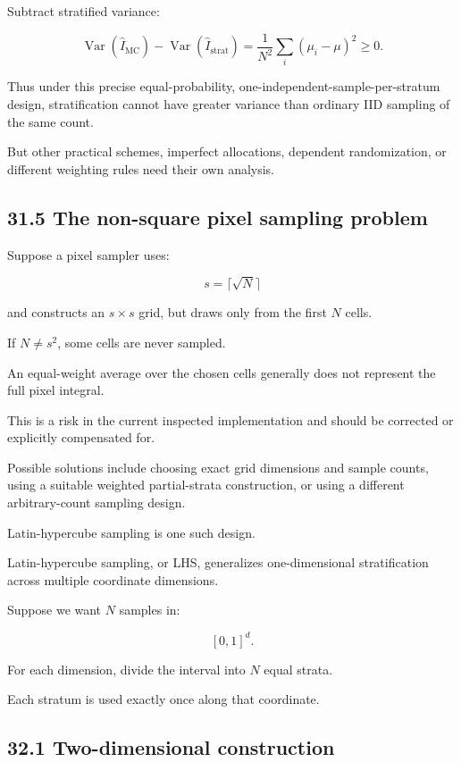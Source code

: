 Subtract stratified variance:

\[ \boxed{ \operatorname{Var}(\widehat I_{\mathrm{MC}}) - \operatorname{Var}(\widehat I_{\mathrm{strat}}) = \frac1{N^2}\sum_i(\mu_i-\mu)^2 \ge0 }. \]

Thus under this precise equal-probability, one-independent-sample-per-stratum design, stratification cannot have greater variance than ordinary IID sampling of the same count.

But other practical schemes, imperfect allocations, dependent randomization, or different weighting rules need their own analysis.

\subsection{31.5 The non-square pixel sampling problem}\label{02-foundations-ii-ch031-the-non-square-pixel-sampling-problem}

\hypertarget{02-foundations-ii-ch031-the-non-square-pixel-sampling-problem}{}

Suppose a pixel sampler uses:

\[ s=\lceil\sqrt N\rceil \]

and constructs an \(s\times s\) grid, but draws only from the first \(N\) cells.

If \(N\ne s^2\), some cells are never sampled.

An equal-weight average over the chosen cells generally does not represent the full pixel integral.

This is a risk in the current inspected  implementation and should be corrected or explicitly compensated for.

Possible solutions include choosing exact grid dimensions and sample counts, using a suitable weighted partial-strata construction, or using a different arbitrary-count sampling design.

Latin-hypercube sampling is one such design.

Latin-hypercube sampling, or LHS, generalizes one-dimensional stratification across multiple coordinate dimensions.

Suppose we want \(N\) samples in:

\[ [0,1]^d. \]

For each dimension, divide the interval into \(N\) equal strata.

Each stratum is used exactly once along that coordinate.

\subsection{32.1 Two-dimensional construction}\label{02-foundations-ii-ch031-two-dimensional-construction}

